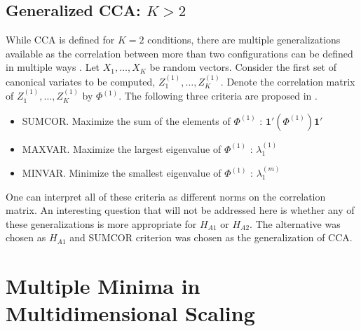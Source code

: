 \documentclass[12pt,oneside,final]{thesis}\usepackage[]{graphicx}\usepackage[]{color}
\begin{document}
\section{Generalized CCA: $K>2$ \label{sec:GenCCA}}

While CCA is defined for $K=2$ conditions, there are multiple generalizations available as the correlation between more than two configurations can be defined in multiple ways \cite{generalCCA}. Let $X_1,\ldots,X_K$ be random vectors. Consider the first set of canonical variates to be computed, $Z_1^{(1)},\ldots,Z_K^{(1)}$. Denote  the correlation matrix of  $Z_1^{(1)},\ldots,Z_K^{(1)}$ by $\Phi^{(1)}$.   The following three criteria  are proposed in \cite{generalCCA}.
\begin{itemize}
\item SUMCOR. Maximize the sum of the elements of $\Phi^{(1)}$ : $\mathbf{1'}(\Phi^{(1)})\mathbf{1'}$
\item MAXVAR. Maximize the largest eigenvalue of $\Phi^{(1)}$ : $\lambda^{(1)}_1$ 
\item  MINVAR. Minimize  the smallest eigenvalue of $\Phi^{(1)}$ : $\lambda^{(m)}_1$ 
\end{itemize}
One can interpret all of these criteria as different norms on the correlation matrix.
An interesting question that will not be addressed here is whether any of these generalizations is more appropriate for $H_{A1}$ or $H_{A2}$.
The alternative was chosen as $ H_{A1}$ and SUMCOR criterion was chosen as the generalization of CCA.




\chapter{Multiple Minima in  Multidimensional Scaling }
\label{sec:MultMinima}
\end{document}
